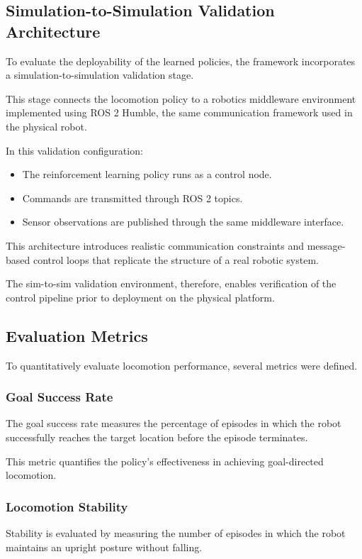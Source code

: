 \documentclass[pdflatex,sn-mathphys-num]{sn-jnl}%
\theoremstyle{thmstyleone}%
\theoremstyle{thmstyletwo}%
\theoremstyle{thmstylethree}%
\begin{document}
\subsection{Simulation-to-Simulation Validation Architecture}
To evaluate the deployability of the learned policies, the framework incorporates a simulation-to-simulation validation stage.

This stage connects the locomotion policy to a robotics middleware environment implemented using ROS 2 Humble, the same communication framework used in the physical robot.

In this validation configuration:
\begin{itemize}
    \item The reinforcement learning policy runs as a control node.
    \item Commands are transmitted through ROS 2 topics.
    \item Sensor observations are published through the same middleware interface.
\end{itemize}  

This architecture introduces realistic communication constraints and message-based control loops that replicate the structure of a real robotic system.

The sim-to-sim validation environment, therefore, enables verification of the control pipeline prior to deployment on the physical platform.

\subsection{Evaluation Metrics}
To quantitatively evaluate locomotion performance, several metrics were defined.

\subsubsection{Goal Success Rate}
The goal success rate measures the percentage of episodes in which the robot successfully reaches the target location before the episode terminates.

This metric quantifies the policy's effectiveness in achieving goal-directed locomotion.

\subsubsection{Locomotion Stability}
Stability is evaluated by measuring the number of episodes in which the robot maintains an upright posture without falling.
\end{document}
